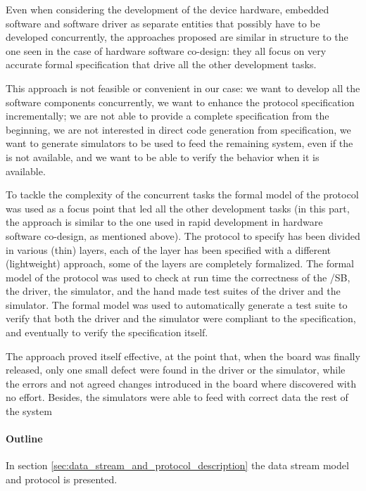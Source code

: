 \documentclass{article} \usepackage{times}
\begin{document}
Even when considering the development of the device hardware, embedded
software and software driver as separate entities that possibly have
to be developed concurrently, the approaches proposed are similar in
structure to the one seen in the case of hardware software
co-design\cite{Valderrama1995,Siegmund2002,Ryzhyk2009}: they all focus
on very accurate formal specification that drive all the other
development tasks.

This approach is not feasible or convenient in our case: we want to
develop all the software components concurrently, we want to enhance
the protocol specification incrementally; we are not able to provide a
complete specification from the beginning, we are not interested in
direct code generation from specification, we want to generate
simulators to be used to feed the remaining system, even if the \STSB
is not available, and we want to be able to verify the \STSB behavior
when it is available.

To tackle the complexity of the concurrent tasks the formal model of
the protocol was used as a focus point that led all the other
development tasks (in this part, the approach is similar to the one
used in rapid development in hardware software co-design, as mentioned
above).  The protocol to specify has been divided in various (thin)
layers, each of the layer has been specified with a different
(lightweight) approach, some of the layers are completely formalized.
The formal model of the protocol was used to check at run time the
correctness of the /SB, the driver, the simulator, and the hand made
test suites of the driver and the simulator.  The formal model was
used to automatically generate a test suite to verify that both the
driver and the simulator were compliant to the specification, and
eventually to verify the specification itself.

The approach proved itself effective, at the point that, when the
board was finally released, only one small defect were found in the
driver or the simulator, while the errors and not agreed changes
introduced in the board where discovered with no effort.  Besides, the
simulators were able to feed with correct data the rest of the system

\paragraph*{Outline}

In section \ref{sec:data_stream_and_protocol_description} the data
stream model and protocol is presented.
\end{document}
